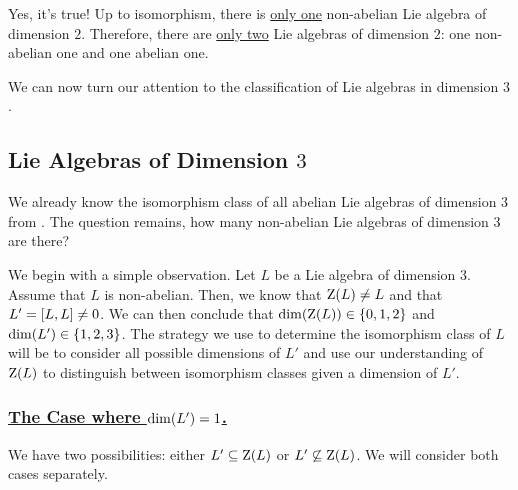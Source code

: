 Yes, it's true! Up to isomorphism, there is \underline{only one} non-abelian Lie algebra of dimension $2$. Therefore, there are \underline{only two} Lie algebras of dimension $2$: one non-abelian one and one abelian one.

We can now turn our attention to the classification of Lie algebras in dimension $3$.

\subsection{Lie Algebras of Dimension $3$}

We already know the isomorphism class of all abelian Lie algebras of dimension $3$ from . The question remains, how many non-abelian Lie algebras of dimension $3$ are there?

We begin with a simple observation. Let $L$ be a Lie algebra of dimension $3$. Assume that $L$ is non-abelian. Then, we know that $\operatorname{Z}\!\left( L \right) \neq L$ and that $L' = \left[ L, L \right] \neq 0$. We can then conclude that $\dim\!\left( \operatorname{Z}\!\left( L \right) \right) \in \left\{ 0, 1, 2 \right\}$ and $\dim\!\left( L' \right) \in \left\{ 1, 2, 3 \right\}$. The strategy we use to determine the isomorphism class of $L$ will be to consider all possible dimensions of $L'$ and use our understanding of $\operatorname{Z}\!\left( L \right)$ to distinguish between isomorphism classes given a dimension of $L'$.

\subsubsection{\underline{The Case where $\dim\!\left( L' \right) = 1$.}}

We have two possibilities: either $L' \subseteq \operatorname{Z}\!\left( L \right)$ or $L' \not\subseteq \operatorname{Z}\!\left( L \right)$. We will consider both cases separately.

